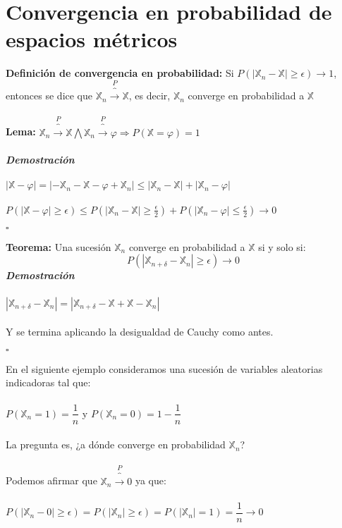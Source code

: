 \documentclass[12pt,a4paper]{book}
\begin{document}
\section{Convergencia en probabilidad de espacios métricos}
\textbf{Definición de convergencia en probabilidad:} Si $P(| \mathbb{X}_n- \mathbb{X} | \geq\epsilon)\rightarrow 1$, entonces se dice que $\mathbb{X}_n\overbrace{\longrightarrow}^P \mathbb{X}$, es decir, $\mathbb{X}_n$ converge en probabilidad a $\mathbb{X}$
\\\\
\textbf{Lema:} $\mathbb{X}_n\overbrace{\longrightarrow}^P \mathbb{X} \bigwedge \mathbb{X}_n\overbrace{\longrightarrow}^P \mathbb{\varphi}\Longrightarrow P(\mathbb{X}=\varphi)=1$\\\\
\textit{\textbf{Demostración}}\\\\
$| \mathbb{X}-\varphi |=|-\mathbb{X}_n - \mathbb{X}-\varphi + \mathbb{X}_n | \leq |\mathbb{X}_n - \mathbb{X}|+|\mathbb{X}_n-\varphi |$\\\\
$P(| \mathbb{X}- \varphi | \geq\epsilon)\leq P(| \mathbb{X}_n- \mathbb{X} | \geq\frac{\epsilon}{2})+P(| \mathbb{X}_n- \varphi | \leq\frac{\epsilon}{2})\rightarrow 0$
\begin{flushright}
$\square$
\end{flushright}
\textbf{Teorema:} Una sucesión $\mathbb{X}_n$ converge en probabilidad a $\mathbb{X}$ si y solo si:
$$P(| \mathbb{X}_{n+\delta}-\mathbb{X}_n |\geq\epsilon)\longrightarrow 0$$
\textit{\textbf{Demostración}}\\\\
 $| \mathbb{X}_{n+\delta}-\mathbb{X}_n |= |   \mathbb{X}_{n+\delta}-\mathbb{X}+\mathbb{X}-\mathbb{X}_n  |$\\\\
 Y se termina aplicando la desigualdad de Cauchy como antes.
 \begin{flushright}
$\square$
\end{flushright}
En el siguiente ejemplo consideramos una sucesión de variables aleatorias indicadoras tal que:\\\\
$P(\mathbb{X}_n=1)=\dfrac{1}{n}$ y $P(\mathbb{X}_n=0)=1-\dfrac{1}{n}$\\\\
La pregunta es, ¿a dónde converge en probabilidad $\mathbb{X}_n$?\\\\
Podemos afirmar que $\mathbb{X}_n\overbrace{\longrightarrow}^P 0$ ya que:\\\\
$P ( | \mathbb{X}_n - 0 | \geq\epsilon)=P(| \mathbb{X}_n | \geq\epsilon)=P(| \mathbb{X}_n | =1)=\dfrac{1}{n}\rightarrow 0$
\end{document}
